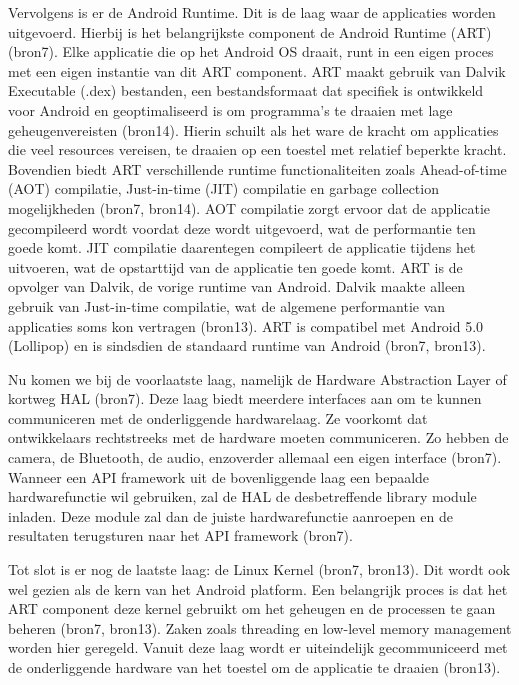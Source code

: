 Vervolgens is er de Android Runtime. Dit is de laag waar de applicaties worden uitgevoerd. Hierbij is het belangrijkste component de Android Runtime (ART) (bron7). Elke applicatie die op het Android OS draait, runt in een eigen proces met een eigen instantie van dit ART component. ART maakt gebruik van Dalvik Executable (.dex) bestanden, een bestandsformaat dat specifiek is ontwikkeld voor Android en geoptimaliseerd is om programma's te draaien met lage geheugenvereisten (bron14). Hierin schuilt als het ware de kracht om applicaties die veel resources vereisen, te draaien op een toestel met relatief beperkte kracht. Bovendien biedt ART verschillende runtime functionaliteiten zoals Ahead-of-time (AOT) compilatie, Just-in-time (JIT) compilatie en garbage collection mogelijkheden (bron7, bron14). AOT compilatie zorgt ervoor dat de applicatie gecompileerd wordt voordat deze wordt uitgevoerd, wat de performantie ten goede komt. JIT compilatie daarentegen compileert de applicatie tijdens het uitvoeren, wat de opstarttijd van de applicatie ten goede komt. ART is de opvolger van Dalvik, de vorige runtime van Android. Dalvik maakte alleen gebruik van Just-in-time compilatie, wat de algemene performantie van applicaties soms kon vertragen (bron13). ART is compatibel met Android 5.0 (Lollipop) en is sindsdien de standaard runtime van Android (bron7, bron13).

Nu komen we bij de voorlaatste laag, namelijk de Hardware Abstraction Layer of kortweg HAL (bron7). Deze laag biedt meerdere interfaces aan om te kunnen communiceren met de onderliggende hardwarelaag. Ze voorkomt dat ontwikkelaars rechtstreeks met de hardware moeten communiceren. Zo hebben de camera, de Bluetooth, de audio, enzoverder allemaal een eigen interface (bron7). Wanneer een API framework uit de bovenliggende laag een bepaalde hardwarefunctie wil gebruiken, zal de HAL de desbetreffende library module inladen. Deze module zal dan de juiste hardwarefunctie aanroepen en de resultaten terugsturen naar het API framework (bron7).

Tot slot is er nog de laatste laag: de Linux Kernel (bron7, bron13). Dit wordt ook wel gezien als de kern van het Android platform. Een belangrijk proces is dat het ART component deze kernel gebruikt om het geheugen en de processen te gaan beheren (bron7, bron13). Zaken zoals threading en low-level memory management worden hier geregeld. Vanuit deze laag wordt er uiteindelijk gecommuniceerd met de onderliggende hardware van het toestel om de applicatie te draaien (bron13).

